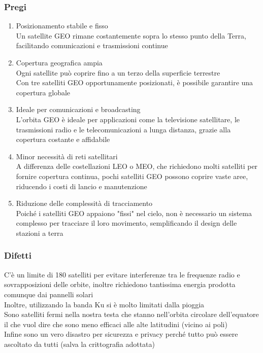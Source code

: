 \documentclass[10pt,oneside,a4paper]{article}
\begin{document}
\subsubsection{Pregi}
\begin{enumerate}
\item Posizionamento stabile e fisso\\
Un satellite GEO rimane costantemente sopra lo stesso punto della Terra, facilitando comunicazioni e trasmissioni continue
\item Copertura geografica ampia\\
Ogni satellite può coprire fino a un terzo della superficie terrestre\\
Con tre satelliti GEO opportunamente posizionati, è possibile garantire una copertura globale 
\item Ideale per comunicazioni e broadcasting\\
L'orbita GEO è ideale per applicazioni come la televisione satellitare, le trasmissioni radio e le telecomunicazioni a lunga distanza, grazie alla copertura costante e affidabile
\item Minor necessità di reti satellitari\\
A differenza delle costellazioni LEO o MEO, che richiedono molti satelliti per fornire copertura continua, pochi satelliti GEO possono coprire vaste aree, riducendo i costi di lancio e manutenzione
\item Riduzione delle complessità di tracciamento\\
Poiché i satelliti GEO appaiono "fissi" nel cielo, non è necessario un sistema complesso per tracciare il loro movimento, semplificando il design delle stazioni a terra
\end{enumerate}
\subsubsection{Difetti}
C'è un limite di 180 satelliti per evitare interferenze tra le frequenze radio e sovrapposizioni delle orbite, inoltre richiedono tantissima energia prodotta comunque dai pannelli solari\\
Inoltre, utilizzando la banda Ku si è molto limitati dalla pioggia\\
Sono satelliti fermi nella nostra testa che stanno nell'orbita circolare dell'equatore il che vuol dire che sono meno efficaci alle alte latitudini (vicino ai poli)\\
Infine sono un vero disastro per sicurezza e privacy perché tutto può essere ascoltato da tutti (salva la crittografia adottata)
\end{document}
